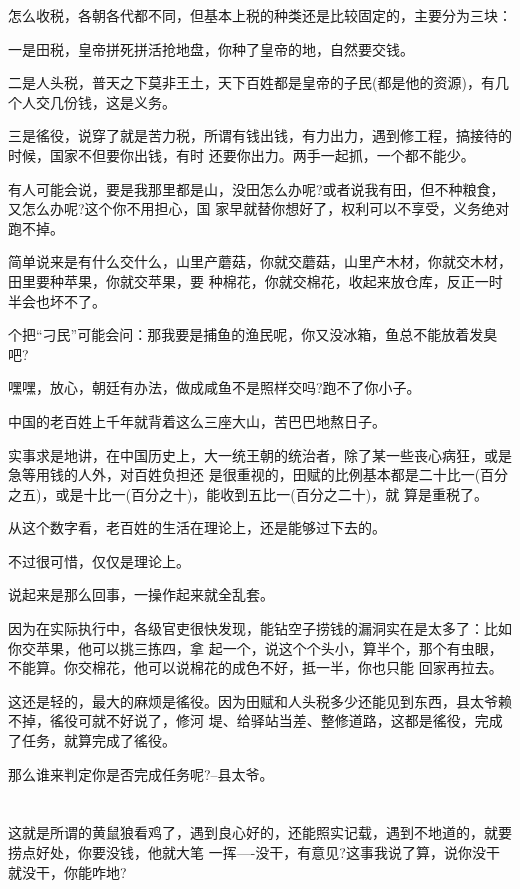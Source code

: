 \documentclass[11pt,a4paper,onecolumn]{article}
\begin{document}
怎么收税，各朝各代都不同，但基本上税的种类还是比较固定的，主要分为三块：

一是田税，皇帝拼死拼活抢地盘，你种了皇帝的地，自然要交钱。

二是人头税，普天之下莫非王土，天下百姓都是皇帝的子民(都是他的资源)，有几个人交几份钱，这是义务。

三是徭役，说穿了就是苦力税，所谓有钱出钱，有力出力，遇到修工程，搞接待的时候，国家不但要你出钱，有时
还要你出力。两手一起抓，一个都不能少。

有人可能会说，要是我那里都是山，没田怎么办呢?或者说我有田，但不种粮食，又怎么办呢?这个你不用担心，国
家早就替你想好了，权利可以不享受，义务绝对跑不掉。

简单说来是有什么交什么，山里产蘑菇，你就交蘑菇，山里产木材，你就交木材，田里要种苹果，你就交苹果，要
种棉花，你就交棉花，收起来放仓库，反正一时半会也坏不了。

个把``刁民''可能会问：那我要是捕鱼的渔民呢，你又没冰箱，鱼总不能放着发臭吧?

嘿嘿，放心，朝廷有办法，做成咸鱼不是照样交吗?跑不了你小子。

中国的老百姓上千年就背着这么三座大山，苦巴巴地熬日子。

实事求是地讲，在中国历史上，大一统王朝的统治者，除了某一些丧心病狂，或是急等用钱的人外，对百姓负担还
是很重视的，田赋的比例基本都是二十比一(百分之五)，或是十比一(百分之十)，能收到五比一(百分之二十)，就
算是重税了。

从这个数字看，老百姓的生活在理论上，还是能够过下去的。

不过很可惜，仅仅是理论上。

说起来是那么回事，一操作起来就全乱套。

因为在实际执行中，各级官吏很快发现，能钻空子捞钱的漏洞实在是太多了：比如你交苹果，他可以挑三拣四，拿
起一个，说这个个头小，算半个，那个有虫眼，不能算。你交棉花，他可以说棉花的成色不好，抵一半，你也只能
回家再拉去。

这还是轻的，最大的麻烦是徭役。因为田赋和人头税多少还能见到东西，县太爷赖不掉，徭役可就不好说了，修河
堤、给驿站当差、整修道路，这都是徭役，完成了任务，就算完成了徭役。

那么谁来判定你是否完成任务呢?--县太爷。

\section[\thesection]{}

这就是所谓的黄鼠狼看鸡了，遇到良心好的，还能照实记载，遇到不地道的，就要捞点好处，你要没钱，他就大笔
一挥----没干，有意见?这事我说了算，说你没干就没干，你能咋地?
\end{document}
